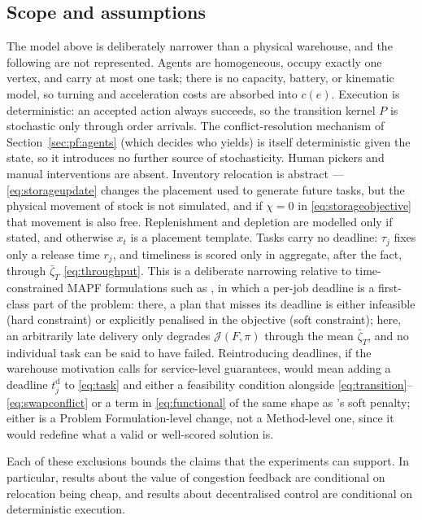 \documentclass[../main.tex]{subfiles}
\begin{document}
\subsection{Scope and assumptions}
\label{sec:pf:scope}

The model above is deliberately narrower than a physical warehouse, and the
following are not represented. Agents are homogeneous, occupy exactly one vertex,
and carry at most one task; there is no capacity, battery, or kinematic model, so
turning and acceleration costs are absorbed into $c(e)$. Execution is
deterministic: an accepted action always succeeds, so the transition kernel $P$
is stochastic only through order arrivals. The conflict-resolution mechanism of %
Section~\ref{sec:pf:agents} (which decides who yields) is itself deterministic
given the state, so it introduces no further source of stochasticity. Human
pickers and manual interventions are absent. Inventory relocation is abstract ---
\eqref{eq:storageupdate} changes the placement used to generate future tasks, but
the physical movement of stock is not simulated, and if $\chi = 0$ in
\eqref{eq:storageobjective} that movement is also free. Replenishment and
depletion are modelled only if stated, and otherwise $x_t$ is a placement
template. Tasks carry no deadline: $\tau_j$ fixes only a release time $r_j$, and %
timeliness is scored only in aggregate, after the fact, through
$\bar{\zeta}_T$ \eqref{eq:throughput}. This is a deliberate narrowing relative to
time-constrained MAPF formulations such as \citet{knippenberg2021}, in which a
per-job deadline is a first-class part of the problem: there, a plan that misses
its deadline is either infeasible (hard constraint) or explicitly penalised in
the objective (soft constraint); here, an arbitrarily late delivery only
degrades $\mathcal{J}(F,\pi)$ through the mean $\bar\zeta_T$, and no individual
task can be said to have failed. Reintroducing deadlines, if the warehouse
motivation calls for service-level guarantees, would mean adding a deadline
$t_j^{\mathrm{d}}$ to \eqref{eq:task} and either a feasibility condition
alongside \eqref{eq:transition}--\eqref{eq:swapconflict} or a term in
\eqref{eq:functional} of the same shape as \citet{knippenberg2021}'s soft
penalty; either is a Problem Formulation-level change, not a Method-level one,
since it would redefine what a valid or well-scored solution is.

Each of these exclusions bounds the claims that the experiments can support. In
particular, results about the value of congestion feedback are conditional on
relocation being cheap, and results about decentralised control are conditional
on deterministic execution.
\end{document}

